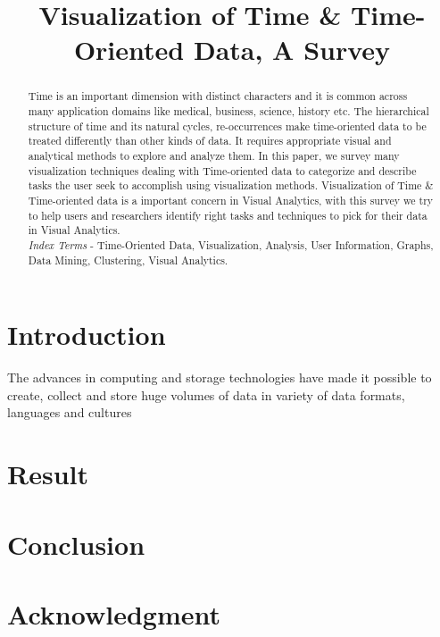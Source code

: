\documentclass[conference]{IEEEtran}
\begin{document}
\title{Visualization of Time \& Time-Oriented Data, A Survey}

\author{
}

\maketitle

\begin{abstract}
Time is an important dimension with distinct characters and it is common across many application domains like medical, business, science, history etc. The hierarchical structure of time and its natural cycles, re-occurrences make time-oriented data to be treated differently than other kinds of data. It requires appropriate visual and analytical methods to explore and analyze them. In this paper, we survey many visualization techniques dealing with Time-oriented data to categorize and describe tasks the user seek to accomplish using visualization methods. Visualization of Time \& Time-oriented data is a important concern in Visual Analytics, with this survey we try to help users and researchers identify right tasks and techniques to pick for their data in Visual Analytics. \\

\textit{Index Terms} - Time-Oriented Data, Visualization, Analysis, User Information, Graphs, Data Mining, Clustering, Visual Analytics.     
\end{abstract}

\section{Introduction}
The advances in computing and storage technologies have made it possible to create, collect and store huge volumes of data in variety of data formats, languages and cultures\cite{keim}

\section{Result}



\section{Conclusion}
  

\section*{Acknowledgment}





\end{document}
